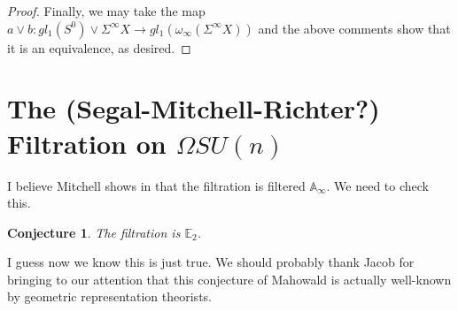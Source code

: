 \documentclass[reqno, oneside]{amsart}
\theoremstyle{definition}
\theoremstyle{plain}
\newtheorem{cnj}[nul]{Conjecture}
\DeclareMathOperator{\E}{\mathbb{E}}
\DeclareMathOperator{\Gr}{\textbf{Gr}}
\DeclareMathOperator{\Sp}{\text{Sp}}
\begin{document}
\begin{proof}
Finally, we may take the map $a\vee b: gl_1(S^0)\vee \Sigma^\infty X \to gl_1(\omega_\infty (\Sigma^{\infty} X))$ and the above comments show that it is an equivalence, as desired.  













\end{proof}


\section{The (Segal-Mitchell-Richter?) Filtration on \texorpdfstring{$\Omega SU(n)$}{Loops SU(n)}}

I believe Mitchell shows in \cite{MitchellSU(n)} that the filtration is filtered $\mathbb{A}_\infty$.  We need to check this.

\begin{cnj} The filtration is $\mathbb{E}_2$.
\end{cnj}
I guess now we know this is just true.  We should probably thank Jacob for bringing to our attention that this conjecture of Mahowald is actually well-known by geometric representation theorists.  
\end{document}
